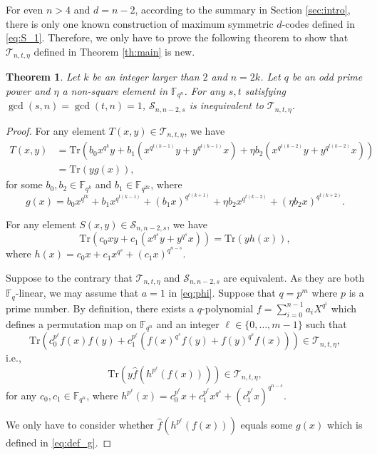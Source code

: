 \documentclass{amsart}
\theoremstyle{plain}
\newtheorem{theorem}{Theorem}[section]
\theoremstyle{definition}
\newcommand{\F}{\mathbb F}
\newcommand{\fqn}{\mathbb{F}_{q^n}}
\newcommand{\cS}{\mathcal S}
\newcommand{\Tr}{ \ensuremath{ \mathrm{Tr}}}
\newcommand{\cT}{\mathcal{T}}
\begin{document}
	For even $n>4$ and $d=n-2$, according to the summary in Section \ref{sec:intro}, there is only one known construction of maximum symmetric $d$-codes defined in \eqref{eq:S_1}. Therefore, we only have to prove the following theorem to show that $\cT_{n,t,\eta}$ defined in Theorem \ref{th:main} is new.
	
	\begin{theorem}\label{th:ineq}
		Let $k$ be an integer larger than $2$ and $n=2k$. Let $q$ be an odd prime power and $\eta$ a non-square element in $\fqn$.
		For any $s,t$ satisfying $\gcd(s,n)=\gcd(t,n)=1$,
		$\cS_{n,n-2,s}$ is inequivalent to $\cT_{n,t,\eta}$.
	\end{theorem}
	\begin{proof}
		For any element $T(x,y) \in \cT_{n,t,\eta}$, we have
		\begin{align*}
			T(x,y)&=\Tr\left(b_0x^{q^{k}}y+b_1\left(x^{q^{t(k-1)}}y+y^{q^{t(k-1)}}x\right)+\eta b_2\left(x^{q^{ t(k-2)}}y+y^{q^{t(k-2)}}x\right)\right)\\
			&=\Tr(yg(x)),
		\end{align*}
		for some $b_0,b_2\in \F_{q^k}$ and $b_1\in \F_{q^{2k}}$, 
		where 
		\begin{equation}\label{eq:def_g}
			g(x)=b_0x^{q^{tk}}+b_1x^{q^{t(k-1)}}+(b_1x)^{q^{t(k+1)}}+\eta b_2x^{q^{t(k-2)}}+(\eta b_2x)^{q^{t(k+2)}}.
		\end{equation}
		
		For any element $S(x,y)\in \cS_{n,n-2,s}$, we have
		\[\Tr\left(c_0xy+c_1\left(x^{q^{s}}y+y^{q^{s}}x\right)\right)=\Tr\left(yh(x)\right),\]
		where $h(x)=c_0x+c_1x^{q^{s}}+(c_1x)^{q^{n-s}}$.
		
		Suppose to the contrary that $\cT_{n,t,\eta}$ and $\cS_{n,n-2,s}$ are equivalent. As they are both $\F_q$-linear, we may assume that $a=1$ in \eqref{eq:phi}.
		Suppose that $q=p^m$ where $p$ is a prime number. 
		By definition, there exists a
		$q$-polynomial $f=\sum_{i=0}^{n-1}a_i X^{q^i}$ which defines a permutation map on $\fqn$ and an integer $\ell\in\{0,\dots,m-1\}$ such that
		\[
		\Tr\left(c_0^{p^\ell}f(x)f(y)+c_1^{p^\ell}\left(f(x)^{q^{s}}f(y)+f(y)^{q^{s}}f(x)\right)\right)\in \cT_{n,t,\eta},
		\]
		i.e.,
		\[
		\Tr\left(y\hat{f}\left(h^{p^\ell} (f(x))\right)\right)\in \cT_{n,t,\eta},
		\]
		for any $c_0,c_1\in \fqn$, where $h^{p^\ell}(x) =c_0^{p^\ell}x+c_1^{p^\ell}x^{q^{s}}+(c_1^{p^\ell}x)^{q^{n-s}}$.
		
		We only have to consider whether $\hat{f}\left(h^{p^\ell} (f(x))\right)$ equals some $g(x)$ which is defined in \eqref{eq:def_g}.
		

\end{proof}
\end{document}
